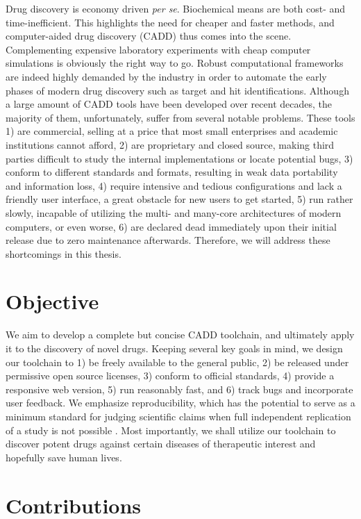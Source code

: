 Drug discovery is economy driven \textit{per se}. Biochemical means are both cost- and time-inefficient. This highlights the need for cheaper and faster methods, and computer-aided drug discovery (CADD) thus comes into the scene. Complementing expensive laboratory experiments with cheap computer simulations is obviously the right way to go. Robust computational frameworks are indeed highly demanded by the industry in order to automate the early phases of modern drug discovery such as target and hit identifications. Although a large amount of CADD tools have been developed over recent decades, the majority of them, unfortunately, suffer from several notable problems. These tools 1) are commercial, selling at a price that most small enterprises and academic institutions cannot afford, 2) are proprietary and closed source, making third parties difficult to study the internal implementations or locate potential bugs, 3) conform to different standards and formats, resulting in weak data portability and information loss, 4) require intensive and tedious configurations and lack a friendly user interface, a great obstacle for new users to get started, 5) run rather slowly, incapable of utilizing the multi- and many-core architectures of modern computers, or even worse, 6) are declared dead immediately upon their initial release due to zero maintenance afterwards. Therefore, we will address these shortcomings in this thesis.

\section{Objective}

We aim to develop a complete but concise CADD toolchain, and ultimately apply it to the discovery of novel drugs. Keeping several key goals in mind, we design our toolchain to 1) be freely available to the general public, 2) be released under permissive open source licenses, 3) conform to official standards, 4) provide a responsive web version, 5) run reasonably fast, and 6) track bugs and incorporate user feedback. We emphasize reproducibility, which has the potential to serve as a minimum standard for judging scientific claims when full independent replication of a study is not possible \citep{965}. Most importantly, we shall utilize our toolchain to discover potent drugs against certain diseases of therapeutic interest and hopefully save human lives.

\section{Contributions}

